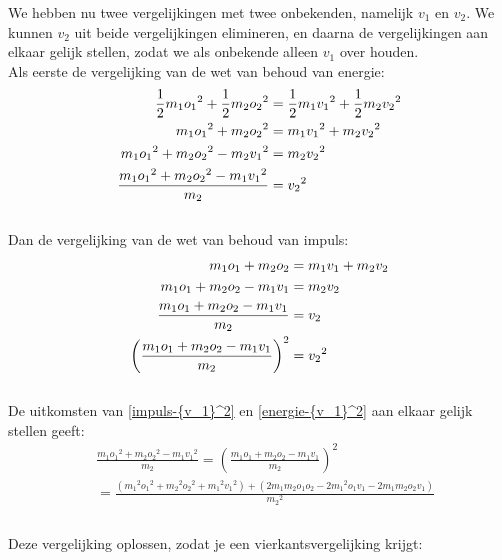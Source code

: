 \documentclass[12pt,a4paper]{article}
\begin{document}
	We hebben nu twee vergelijkingen met twee onbekenden, namelijk $v_1$ en $v_2$. We kunnen $v_2$ uit beide vergelijkingen elimineren, en daarna de vergelijkingen aan elkaar gelijk stellen, zodat we als onbekende alleen $v_1$ over houden.
	\\Als eerste de vergelijking van de wet van behoud van energie:
	\begin{equation}
		\label{energie-{v_1}^2}
		\begin{aligned}
			\frac{1}{2} m_1 {o_1}^2 + \frac{1}{2} m_2 {o_2}^2 &= \frac{1}{2} m_1{v_1}^2 + \frac{1}{2}m_2 {v_2}^2\\
			m_1 {o_1}^2 + m_2 {o_2}^2 &= m_1{v_1}^2 + m_2 {v_2}^2\\
			m_1 {o_1}^2 + m_2 {o_2}^2 - m_2 {v_1}^2 &= m_2{v_2}^2\\
			\frac{m_1 {o_1}^2 + m_2 {o_2}^2 - m_1 {v_1}^2}{m_2} &= {v_2}^2\\
		\end{aligned}
	\end{equation}
	\\Dan de vergelijking van de wet van behoud van impuls:
	\begin{equation}
		\label{impuls-{v_1}^2}
		\begin{aligned}
			m_1 o_1 + m_2 o_2 &=  m_1 v_1 + m_2 v_2\\
			m_1 o_1 + m_2 o_2 - m_1 v_1 &=  m_2 v_2\\
			\frac{m_1 o_1 + m_2 o_2 - m_1 v_1}{m_2} &= v_2\\
			{\left(\frac{m_1 o_1 + m_2 o_2 - m_1 v_1}{m_2}\right)}^2 &= {v_2}^2\\
		\end{aligned}
	\end{equation}
	\\De uitkomsten van \eqref{impuls-{v_1}^2} en \eqref{energie-{v_1}^2} aan elkaar gelijk stellen geeft:
	\begin{equation}
		\begin{aligned}
			&\frac{m_1 {o_1}^2 + m_2 {o_2}^2 - m_1 {v_1}^2}{m_2} = {\left(\frac{m_1 o_1 + m_2 o_2 - m_1 v_1}{m_2}\right)}^2\\
			&= \frac{\left({m_1}^2{o_1}^2 + {m_2}^2{o_2}^2 + {m_1}^2{v_1}^2\right) + \left(2m_1m_2o_1o_2 - 2{m_1}^2o_1v_1 - 2m_1m_2o_2v_1\right)}{{m_2}^2}\\
		\end{aligned}
	\end{equation}
	\\Deze vergelijking oplossen, zodat je een vierkantsvergelijking krijgt:
\end{document}
